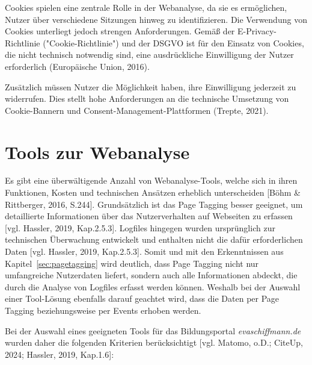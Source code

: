 Cookies spielen eine zentrale Rolle in der Webanalyse, da sie es ermöglichen, Nutzer über verschiedene Sitzungen hinweg zu identifizieren. Die Verwendung von Cookies unterliegt jedoch strengen Anforderungen. Gemäß der E-Privacy-Richtlinie ("Cookie-Richtlinie") und der DSGVO ist für den Einsatz von Cookies, die nicht technisch notwendig sind, eine ausdrückliche Einwilligung der Nutzer erforderlich (Europäische Union, 2016). %

Zusätzlich müssen Nutzer die Möglichkeit haben, ihre Einwilligung jederzeit zu widerrufen. Dies stellt hohe Anforderungen an die technische Umsetzung von Cookie-Bannern und Consent-Management-Plattformen (Trepte, 2021).

\section{Tools zur Webanalyse} %
Es gibt eine überwältigende Anzahl von Webanalyse-Tools, welche sich in ihren Funktionen, Kosten und technischen Ansätzen erheblich unterscheiden [Böhm \& Rittberger, 2016, S.244]. Grundsätzlich ist das Page Tagging besser geeignet, um detaillierte Informationen über das Nutzerverhalten auf Webseiten zu erfassen [vgl. Hassler, 2019, Kap.2.5.3]. Logfiles hingegen wurden ursprünglich zur technischen Überwachung entwickelt und enthalten nicht die dafür erforderlichen Daten [vgl. Hassler, 2019, Kap.2.5.3]. Somit und mit den Erkenntnissen aus Kapitel~\ref{sec:pagetagging} wird deutlich, dass Page Tagging nicht nur umfangreiche Nutzerdaten liefert, sondern auch alle Informationen abdeckt, die durch die Analyse von Logfiles erfasst werden können. Weshalb bei der Auswahl einer Tool-Lösung ebenfalls darauf geachtet wird, dass die Daten per Page Tagging beziehungsweise per Events erhoben werden. 

Bei der Auswahl eines geeigneten Tools für das Bildungsportal \textit{evaschiffmann.de} wurden daher die folgenden Kriterien berücksichtigt [vgl. Matomo, o.D.; CiteUp, 2024; Hassler, 2019, Kap.1.6]:

